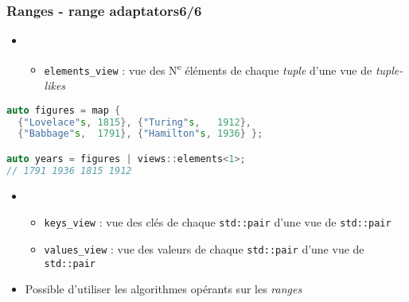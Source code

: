\documentclass[C++.tex]{subfiles}
\begin{document}
\begin{frame}[fragile]
	\frametitle{Ranges - range adaptators\titlehfill{}6/6}
	\begin{itemize}
		\item  [] \begin{itemize}
			\item \lstinline|elements_view| : vue des N\textsuperscript{e} éléments de chaque \textit{tuple} d'une vue de \textit{tuple-likes}
		\end{itemize}
	\end{itemize}

	\begin{lstlisting}[language=C++]
auto figures = map {
  {"Lovelace"s, 1815}, {"Turing"s,   1912},
  {"Babbage"s,  1791}, {"Hamilton"s, 1936} };

auto years = figures | views::elements<1>;
// 1791 1936 1815 1912\end{lstlisting}

	\begin{itemize}
		\item  [] \begin{itemize}
			\item \lstinline|keys_view| : vue des clés de chaque \lstinline|std::pair| d'une vue de \lstinline|std::pair|
			\item \lstinline|values_view| : vue des valeurs de chaque \lstinline|std::pair| d'une vue de \lstinline|std::pair|
		\end{itemize}
	\item Possible d'utiliser les algorithmes opérants sur les \textit{ranges}
	\end{itemize}
\end{frame}
\end{document}
